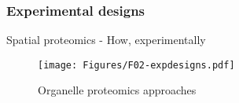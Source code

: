 


\subsubsection*{Experimental designs}
\label{sec:expdesign}

\begin{frame}{Spatial proteomics - How, experimentally}
  \begin{figure}
    \texttt{[image: Figures/F02-expdesigns.pdf]}
    \caption{Organelle proteomics approaches \citep{Gatto:2010}}
  \end{figure}
\end{frame}



